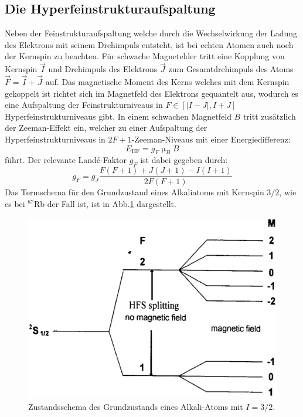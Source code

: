 \subsection{Die Hyperfeinstrukturaufspaltung}
Neben der Feinstrukturaufspaltung welche durch die Wechselwirkung der Ladung des Elektrons mit seinem Drehimpuls entsteht, ist bei echten Atomen auch noch der Kernspin zu beachten. Für schwache Magnetelder tritt eine Kopplung von Kernspin $\vec{I}$ und Drehimpuls des Elektrons $\vec{J}$ zum Gesamtdrehimpuls des Atoms $\vec{F}=\vec{I}+\vec{J}$ auf. Das magnetische Moment des Kerns welches mit dem Kernspin gekoppelt ist richtet sich im Magnetfeld des Elektrons gequantelt aus, wodurch es
eine Aufspaltung der Feinstrukturniveaus in $F \in [|I-J|,I+J]$ Hyperfeinstrukturniveaus gibt.
In einem schwachen Magnetfeld $B$ tritt zusätzlich der Zeeman-Effekt ein, welcher zu einer Aufspaltung der Hyperfeinstrukturniveaus in $2F+1$-Zeeman-Niveaus mit einer Energiedifferenz:
\begin{equation}
  E_{\text{HF}}=g_F\upmu_BB
\end{equation}
führt. Der relevante Landé-Faktor $g_F$ ist dabei gegeben durch:
\begin{equation}
  g_F=g_J\frac{F(F+1)+J(J+1)-I(I+1)}{2F(F+1)}
\end{equation}
Das Termschema für den Grundzustand eines Alkaliatoms mit Kernspin $3/2$, wie es bei $^{87}$Rb der Fall ist, ist in Abb.\ref{Hyperfein} dargestellt.
\begin{figure}
  \centering
  \includegraphics[scale=0.4]{Bilder/Hyperfein}
  \caption{Zustandsschema des Grundzustands eines Alkali-Atoms mit $I=3/2$\cite{Black}.}
  \label{Hyperfein}
\end{figure}
